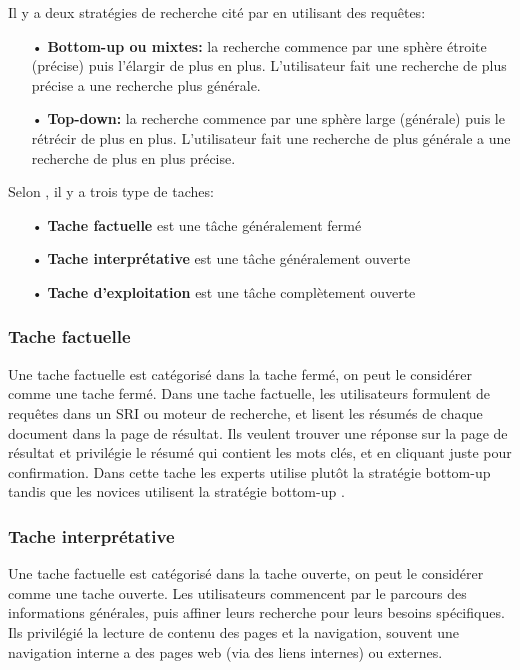 Il y a deux stratégies de recherche cité par \citeauthor{ir-on-web} \citep{ir-on-web} en utilisant des requêtes:
\begin{itemize}
    \item[•] \textbf{Bottom-up ou mixtes:} la recherche commence par une sphère étroite (précise) puis l’élargir de plus en plus. L'utilisateur fait une recherche de plus précise a une recherche plus générale.
    \item[•] \textbf{Top-down:} la recherche commence par une sphère large (générale) puis le rétrécir de plus en plus. L'utilisateur fait une recherche de plus générale a une recherche de plus en plus précise.
\end{itemize}

Selon \citeauthor{ri-sur-le-web} \citep{ri-sur-le-web}, il y a trois type de taches:
\begin{itemize}
    \item[•] \textbf{Tache factuelle} est une tâche généralement fermé
    \item[•] \textbf{Tache interprétative} est une tâche généralement ouverte
    \item[•] \textbf{Tache d'exploitation} est une tâche complètement ouverte
\end{itemize}

\subsubsection{Tache factuelle}
Une tache factuelle est catégorisé dans la tache fermé, on peut le considérer comme une tache fermé. Dans une tache factuelle, les utilisateurs formulent de requêtes dans un SRI ou moteur de recherche, et lisent les résumés de chaque document dans la page de résultat. Ils veulent trouver une réponse sur la page de résultat et privilégie le résumé qui contient les mots clés, et en cliquant juste pour confirmation. Dans cette tache les experts utilise plutôt la stratégie bottom-up tandis que les novices utilisent la stratégie bottom-up \citep{ri-sur-le-web}.

\subsubsection{Tache interprétative}
Une tache factuelle est catégorisé dans la tache ouverte, on peut le considérer comme une tache ouverte. Les utilisateurs commencent par le parcours des informations générales, puis affiner leurs recherche pour leurs besoins spécifiques. Ils privilégié la lecture de contenu des pages et la navigation, souvent une navigation interne a des pages web (via des liens internes) ou externes.

